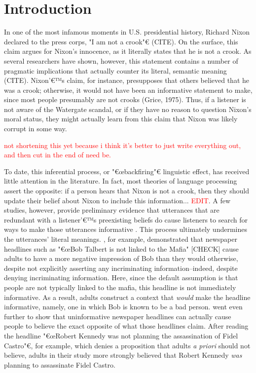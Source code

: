 \documentclass[10pt,letterpaper]{article}
\newcommand{\red}[1]{\textcolor{Red}{#1}}
\begin{document}
\section{Introduction}

In one of the most infamous moments in U.S. presidential history, Richard Nixon declared to the press corps, "I am not a crook"€ (CITE).  On the surface, this claim argues for Nixon's innocence, as it literally states that he is not a crook.  As several researchers have shown, however, this statement contains a number of pragmatic implications that actually counter its literal, semantic meaning (CITE).  Nixon'€™s claim, for instance, presupposes that others believed that he was a crook; otherwise, it would not have been an informative statement to make, since most people presumably are not crooks (Grice, 1975).  Thus, if a listener is not aware of the Watergate scandal, or if they have no reason to question Nixon's moral status, they might actually learn from this claim that Nixon was likely corrupt in some way.

\red{not shortening this yet because i think it's better to just write everything out, and then cut in the end of need be.}

To date, this inferential process, or "€œbackfiring"€ linguistic effect, has received little attention in the literature.  In fact, most theories of language processing assert the opposite: if a person hears that Nixon is not a crook, then they should update their belief about Nixon to include this information... \red{EDIT}.  A few studies, however, provide preliminary evidence that utterances that are redundant with a listener'€™s preexisting beliefs do cause listeners to search for ways to make those utterances informative \cite{Yandell1979, Wegner1981, Gruenfeld1992, Kravtchenko2015}.  This process ultimately undermines the utterances' literal meanings.  
, for example, demonstrated that newspaper headlines such as "€œBob Talbert is not linked to the Mafia" [CHECK] cause adults to have a more negative impression of Bob than they would otherwise, despite not explicitly asserting any incriminating information--indeed, despite denying incriminating information.  Here, since the default assumption is that people are not typically linked to the mafia, this headline is not immediately informative.  As a result, adults construct a context that \emph{would} make the headline informative, namely, one in which Bob is known to be a bad person.  
 went even further to show that uninformative newspaper headlines can actually cause people to believe the exact opposite of what those headlines claim.  After reading the headline "€œRobert Kennedy was not planning the assassination of Fidel Castro"€, for example, which denies a proposition that adults \emph{a priori} should not believe, adults in their study more strongly believed that Robert Kennedy \emph{was} planning to assassinate Fidel Castro.
\end{document}
